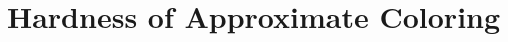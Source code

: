 \documentclass[School=TIFR,twoside]{Dissertate}
\begin{document}
\part{Hardness of Approximate Coloring}\label{part:three}








%

%    

\singlespacing

\clearpage




\end{document}
